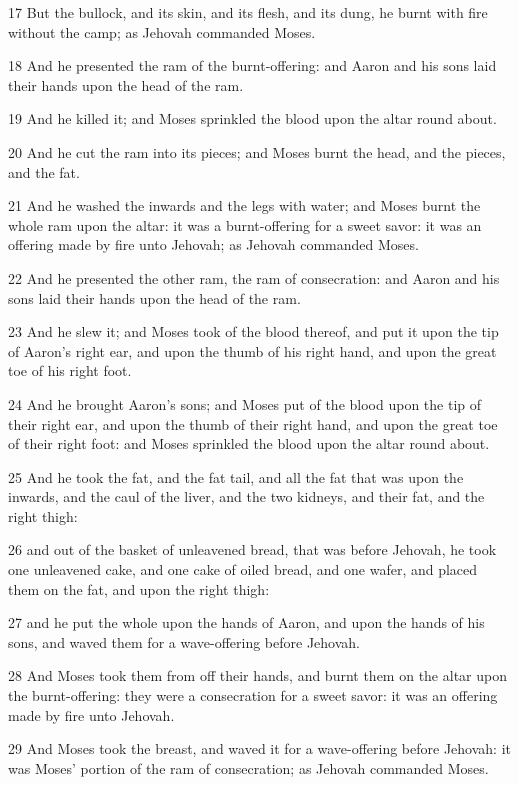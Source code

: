 \par 17 But the bullock, and its skin, and its flesh, and its dung, he burnt with fire without the camp; as Jehovah commanded Moses.
\par 18 And he presented the ram of the burnt-offering: and Aaron and his sons laid their hands upon the head of the ram.
\par 19 And he killed it; and Moses sprinkled the blood upon the altar round about.
\par 20 And he cut the ram into its pieces; and Moses burnt the head, and the pieces, and the fat.
\par 21 And he washed the inwards and the legs with water; and Moses burnt the whole ram upon the altar: it was a burnt-offering for a sweet savor: it was an offering made by fire unto Jehovah; as Jehovah commanded Moses.
\par 22 And he presented the other ram, the ram of consecration: and Aaron and his sons laid their hands upon the head of the ram.
\par 23 And he slew it; and Moses took of the blood thereof, and put it upon the tip of Aaron's right ear, and upon the thumb of his right hand, and upon the great toe of his right foot.
\par 24 And he brought Aaron's sons; and Moses put of the blood upon the tip of their right ear, and upon the thumb of their right hand, and upon the great toe of their right foot: and Moses sprinkled the blood upon the altar round about.
\par 25 And he took the fat, and the fat tail, and all the fat that was upon the inwards, and the caul of the liver, and the two kidneys, and their fat, and the right thigh:
\par 26 and out of the basket of unleavened bread, that was before Jehovah, he took one unleavened cake, and one cake of oiled bread, and one wafer, and placed them on the fat, and upon the right thigh:
\par 27 and he put the whole upon the hands of Aaron, and upon the hands of his sons, and waved them for a wave-offering before Jehovah.
\par 28 And Moses took them from off their hands, and burnt them on the altar upon the burnt-offering: they were a consecration for a sweet savor: it was an offering made by fire unto Jehovah.
\par 29 And Moses took the breast, and waved it for a wave-offering before Jehovah: it was Moses' portion of the ram of consecration; as Jehovah commanded Moses.
